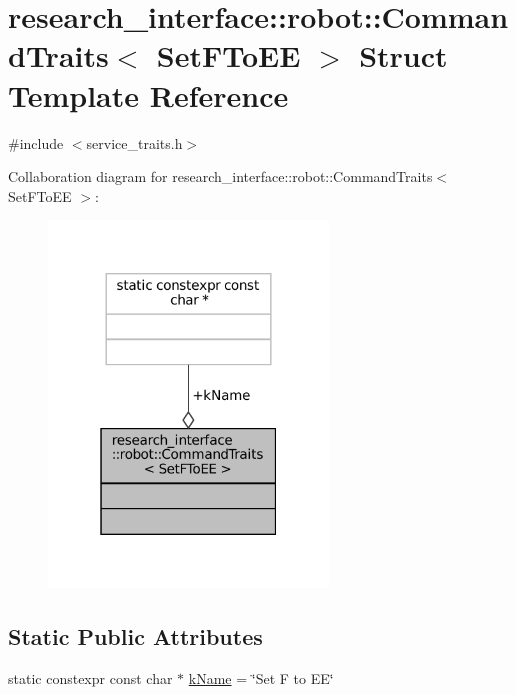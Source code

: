 \hypertarget{structresearch__interface_1_1robot_1_1CommandTraits_3_01SetFToEE_01_4}{}\section{research\+\_\+interface\+:\+:robot\+:\+:Command\+Traits$<$ Set\+F\+To\+EE $>$ Struct Template Reference}
\label{structresearch__interface_1_1robot_1_1CommandTraits_3_01SetFToEE_01_4}


{\ttfamily \#include $<$service\+\_\+traits.\+h$>$}



Collaboration diagram for research\+\_\+interface\+:\+:robot\+:\+:Command\+Traits$<$ Set\+F\+To\+EE $>$\+:
\nopagebreak
\begin{figure}[H]
\begin{center}
\leavevmode
\includegraphics[width=211pt]{structresearch__interface_1_1robot_1_1CommandTraits_3_01SetFToEE_01_4__coll__graph}
\end{center}
\end{figure}
\subsection*{Static Public Attributes}
\begin{DoxyCompactItemize}
\item 
static constexpr const char $\ast$ \hyperlink{structresearch__interface_1_1robot_1_1CommandTraits_3_01SetFToEE_01_4_ae9ea2a226f16b3d50153aa7eacf2f1b4}{k\+Name} = \char`\"{}Set F to EE\char`\"{}
\end{DoxyCompactItemize}


